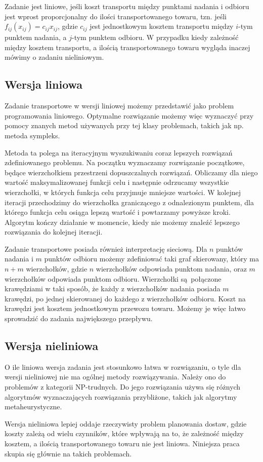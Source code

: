 Zadanie jest liniowe, jeśli koszt transportu między punktami nadania i odbioru jest wprost proporcjonalny 
do ilości transportowanego towaru, tzn. jeśli $f_{ij}(x_{ij}) = c_{ij} x_{ij}$, gdzie $c_{ij}$ jest jednostkowym kosztem transportu 
między $i$-tym punktem nadania, a $j$-tym punktem odbioru. W przypadku kiedy zależność między kosztem transportu, a ilością transportowanego 
towaru wygląda inaczej mówimy o zadaniu nieliniowym.

\subsection{Wersja liniowa}
Zadanie transportowe w wersji liniowej możemy przedstawić jako problem programowania liniowego. Optymalne rozwiązanie możemy więc wyznaczyć 
przy pomocy znanych metod używanych przy tej klasy problemach, takich jak np. metoda sympleks\cite{TP-SYMPLEX-BOOK}. 

Metoda ta polega na 
iteracyjnym wyszukiwaniu coraz lepszych rozwiązań zdefiniowanego problemu. Na początku wyznaczamy rozwiązanie początkowe, będące wierzchołkiem 
przestrzeni dopuszczalnych rozwiązań. Obliczamy dla niego wartość maksymalizowanej funkcji celu i następnie odrzucamy wszystkie 
wierzchołki, w których funkcja celu przyjmuje mniejsze wartości. W kolejnej iteracji przechodzimy do wierzchołka graniczącego z odnalezionym 
punktem, dla którego funkcja celu osiąga lepszą wartość i powtarzamy powyższe kroki. Algorytm kończy działanie w momencie, kiedy nie możemy 
znaleźć lepszego rozwiązania do kolejnej iteracji.

Zadanie transportowe posiada również interpretację sieciową. Dla $n$ punktów nadania i $m$ punktów odbioru możemy zdefiniować taki graf 
skierowany, który ma $n + m$ wierzchołków, gdzie $n$ wierzchołków odpowiada punktom nadania, oraz $m$ wierzchołków odpowiada punktom odbioru.
Wierzchołki są połączone krawędziami w taki sposób, że każdy z wierzchołków nadania posiada $m$ krawędzi, po jednej skierowanej do 
każdego z wierzchołków odbioru. Koszt na krawędzi jest kosztem jednostkowym przewozu towaru. Możemy je więc łatwo sprowadzić do zadania 
największego przepływu\cite{MAX-FLOW-ALG}. 

\subsection{Wersja nieliniowa}
O ile liniowa wersja zadania jest stosunkowo łatwa w rozwiązaniu, o tyle dla wersji nieliniowej nie ma ogólnej metody rozwiązywania. Należy 
ono do problemów z kategorii NP-trudnych\cite{Guisewite1990, NONLINEAR-NP-HARD}. Do jego rozwiązania używa się różnych algorytmów wyznaczających 
rozwiązania przybliżone, takich jak algorytmy metaheurystyczne. 

Wersja nieliniowa lepiej oddaje rzeczywisty problem planowania dostaw, gdzie koszty zależą od wielu czynników, które wpływają na to, 
że zależność między kosztem, a ilością transportowanego towaru nie jest liniowa. Niniejsza praca skupia się głównie na takich problemach.
